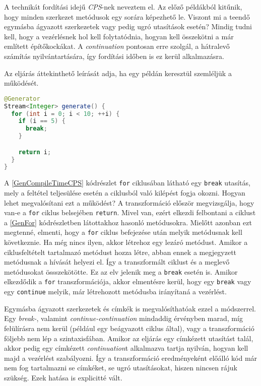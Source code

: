 A technikát fordítási idejű \textit{CPS}-nek neveztem el. Az előző példákból kitűnik, hogy minden szerkezet metódusok egy sorára képezhető le. Viszont mi a teendő egymásba ágyazott szerkezetek vagy pedig ugró utasítások esetén? Mindig tudni kell, hogy a vezérlésnek hol kell folytatódnia, hogyan kell összekötni a már említett építőkockákat. A \textit{continuation} pontosan erre szolgál, a hátralevő számítás nyilvántartására, így fordítási időben is ez kerül alkalmazásra.

Az eljárás áttekinthető leírását adja, ha egy példán keresztül szemléljük a működését.

\begin{lstlisting}[language=Java, caption={Ugró utasítást tartalmazó generátormetódus}, captionpos=b, label=GenCompileTimeCPS, escapechar=$]
@Generator
Stream<Integer> generate() {
  for (int i = 0; i < 10; ++i) {
    if (i == 5) {
      break;
    }

    return i;
  }
}
\end{lstlisting}

A \ref{GenCompileTimeCPS} kódrészlet \texttt{for} ciklusában látható egy \texttt{break} utasítás, mely a feltétel teljesülése esetén a ciklusból való kilépést fogja okozni. Hogyan lehet megvalósítani ezt a működést? A transzformáció először megvizsgálja, hogy van-e a \texttt{for} ciklus belsejében \texttt{return}. Mivel van, ezért elkezdi felbontani a ciklust a \ref{GenFor} kódrészletben látottakhoz hasonló metódusokra. Mielőtt azonban ezt megtenné, elmenti, hogy a \texttt{for} ciklus befejezése után melyik metódusnak kell következnie. Ha még nincs ilyen, akkor létrehoz egy lezáró metódust. Amikor a ciklusfeltételt tartalmazó metódust hozza létre, abban ennek a megjegyzett metódusnak a hívását helyezi el. Így a transzformált ciklust és a meglevő metódusokat össszekötötte. Ez az elv jelenik meg a \texttt{break} esetén is. Amikor elkezdődik a \texttt{for} transzformációja, akkor elmentésre kerül, hogy egy \texttt{break} vagy egy \texttt{continue} melyik, már létrehozott metódusba irányítaná a vezérlést.

Egymásba ágyazott szerkezetek és címkék is megvalósíthatóak ezzel a módszerrel. Egy \textit{break-}, valamint \textit{continue-continuation} mindaddig érvényben marad, míg felülírásra nem kerül (például egy beágyazott ciklus által), vagy a transzformáció följebb nem lép a szintaxisfában. Amikor az eljárás egy címkézett utasítást talál, akkor pedig egy címkézett \textit{continuation}t alkalmazva tartja nyilván, hogyan kell majd a vezérlést szabályozni. Így a transzformáció eredményeként előálló kód már nem fog tartalmazni se címkéket, se ugró utasításokat, hiszen nincsen rájuk szükség. Ezek hatása is explicitté vált.

